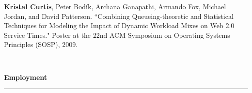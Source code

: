 \documentclass[11pt]{article}
\newcommand{\pagewidth}{6.8 in}
\newcommand{\head}[1]{
{\bf #1} \\
\rule{\textwidth}{0.01 in}

\vspace{-0.35 in}

}
\begin{document}
\begin{tabbing}
\parbox[t]{\pagewidth}{\textbf{Kristal Curtis}, Peter Bod\'{i}k, Archana Ganapathi, Armando Fox, Michael Jordan, and David Patterson.  ``Combining Queueing-theoretic and Statistical Techniques for Modeling the Impact of Dynamic Workload Mixes on Web 2.0 Service Times."  Poster at the 22nd ACM Symposium on Operating Systems Principles (SOSP), 2009.}\\
\end{tabbing}


\head{Employment}
\end{document}
